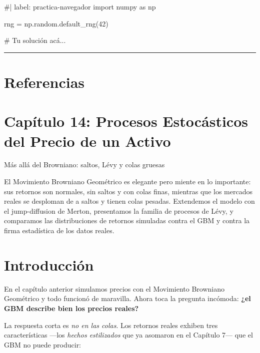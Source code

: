\documentclass[
  spanish,
  letterpaper,
  DIV=11,
  numbers=noendperiod]{scrreprt}
\newenvironment{Shaded}{\begin{snugshade}}{\end{snugshade}}
\newcommand{\NormalTok}[1]{\textcolor[rgb]{0.00,0.23,0.31}{#1}}
\begin{document}
\begin{Shaded}
\begin{Highlighting}[]
\NormalTok{\#| label: practica{-}navegador}
\NormalTok{import numpy as np}

\NormalTok{rng = np.random.default\_rng(42)}

\NormalTok{\# Tu solución acá...}
\end{Highlighting}
\end{Shaded}

\begin{center}\rule{0.5\linewidth}{0.5pt}\end{center}

\chapter{Referencias}\label{referencias-12}

\label{refs}

\chapter{Capítulo 14: Procesos Estocásticos del Precio de un
Activo}\label{capuxedtulo-14-procesos-estocuxe1sticos-del-precio-de-un-activo}

Más allá del Browniano: saltos, Lévy y colas gruesas

El Movimiento Browniano Geométrico es elegante pero miente en lo
importante: sus retornos son normales, sin saltos y con colas finas,
mientras que los mercados reales se desploman de a saltos y tienen colas
pesadas. Extendemos el modelo con el jump-diffusion de Merton,
presentamos la familia de procesos de Lévy, y comparamos las
distribuciones de retornos simuladas contra el GBM y contra la firma
estadística de los datos reales.

\hfill\break

\chapter{Introducción}\label{introducciuxf3n-11}

En el capítulo anterior simulamos precios con el Movimiento Browniano
Geométrico y todo funcionó de maravilla. Ahora toca la pregunta
incómoda: \textbf{¿el GBM describe bien los precios reales?}

La respuesta corta es \emph{no en las colas}. Los retornos reales
exhiben tres características ---los \emph{hechos estilizados} que ya
asomaron en el Capítulo 7--- que el GBM no puede producir:
\end{document}
